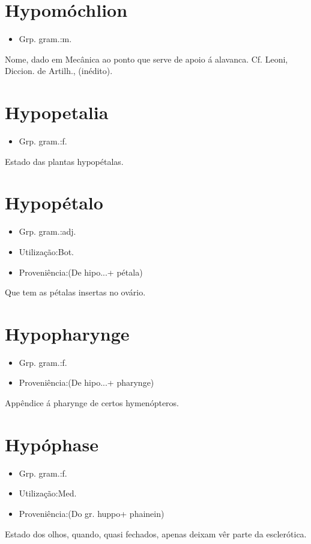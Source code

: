 \documentclass{article}
\begin{document}
\section{Hypomóchlion}
\begin{itemize}
\item {Grp. gram.:m.}
\end{itemize}
Nome, dado em Mecânica ao ponto que serve de apoio á alavanca. Cf. Leoni, \textunderscore Diccion. de Artilh.\textunderscore , (inédito).
\section{Hypopetalia}
\begin{itemize}
\item {Grp. gram.:f.}
\end{itemize}
Estado das plantas hypopétalas.
\section{Hypopétalo}
\begin{itemize}
\item {Grp. gram.:adj.}
\end{itemize}
\begin{itemize}
\item {Utilização:Bot.}
\end{itemize}
\begin{itemize}
\item {Proveniência:(De \textunderscore hipo...\textunderscore  + \textunderscore pétala\textunderscore )}
\end{itemize}
Que tem as pétalas insertas no ovário.
\section{Hypopharynge}
\begin{itemize}
\item {Grp. gram.:f.}
\end{itemize}
\begin{itemize}
\item {Proveniência:(De \textunderscore hipo...\textunderscore  + \textunderscore pharynge\textunderscore )}
\end{itemize}
Appêndice á pharynge de certos hymenópteros.
\section{Hypóphase}
\begin{itemize}
\item {Grp. gram.:f.}
\end{itemize}
\begin{itemize}
\item {Utilização:Med.}
\end{itemize}
\begin{itemize}
\item {Proveniência:(Do gr. \textunderscore huppo\textunderscore  + \textunderscore phainein\textunderscore )}
\end{itemize}
Estado dos olhos, quando, quasi fechados, apenas deixam vêr parte da esclerótica.
\end{document}
